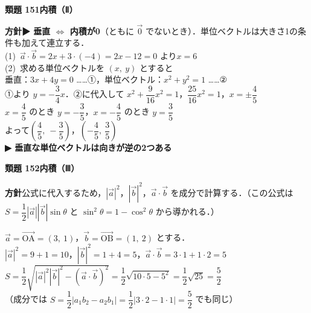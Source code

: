 \documentclass[a4paper,11pt]{ltjsarticle}
\newcommand{\ans}[2]{\Needspace{5\baselineskip}\vspace{6pt}%
  {\sffamily\bfseries 類題 #1\quad #2}\par}
\newcommand{\point}[1]{\textsf{\bfseries ▶ #1}}
\newcommand{\ax}[4]{\draw[->] (#1,0)--(#2,0) node[right]{\scriptsize $x$};
  \draw[->] (0,#3)--(0,#4) node[above]{\scriptsize $y$};
  \node[below left] at (0,0){\scriptsize O};}
\begin{document}
\ans{151}{内積（Ⅱ）}
\begin{kai}
\textbf{方針}\quad \point{垂直 $\iff$ 内積が0}（ともに $\vec0$ でないとき）．単位ベクトルは大きさ1の条件も加えて連立する．\\[2pt]
(1)\ $\vec a\cdot\vec b=2x+3\cdot(-4)=2x-12=0$ より\quad $x=6$\\[2pt]
(2)\ 求める単位ベクトルを $(x,\ y)$ とすると\\
\hspace*{1.5em}垂直：$3x+4y=0$ ……①，\quad 単位ベクトル：$x^2+y^2=1$ ……②\\
\hspace*{1.5em}①より $y=-\dfrac34x$．②に代入して $x^2+\dfrac9{16}x^2=1$，$\dfrac{25}{16}x^2=1$，$x=\pm\dfrac45$\\
\hspace*{1.5em}$x=\dfrac45$ のとき $y=-\dfrac35$，\quad $x=-\dfrac45$ のとき $y=\dfrac35$\\
\hspace*{1.5em}よって\quad $\left(\dfrac45,\ -\dfrac35\right)$，\quad $\left(-\dfrac45,\ \dfrac35\right)$\\
\hspace*{1.5em}\point{垂直な単位ベクトルは向きが逆の2つある}
\begin{center}
\end{center}
\end{kai}

\ans{152}{内積（Ⅲ）}
\begin{kai}
\textbf{方針}\quad 公式に代入するため，$|\vec a|^2$，$|\vec b|^2$，$\vec a\cdot\vec b$ を成分で計算する．（この公式は $S=\dfrac12|\vec a||\vec b|\sin\theta$ と $\sin^2\theta=1-\cos^2\theta$ から導かれる．）\\[2pt]
\begin{center}
\end{center}
$\vec a=\overrightarrow{\mathrm{OA}}=(3,\ 1)$，$\vec b=\overrightarrow{\mathrm{OB}}=(1,\ 2)$ とする．\\
\hspace*{1.5em}$|\vec a|^2=9+1=10$，\quad $|\vec b|^2=1+4=5$，\quad $\vec a\cdot\vec b=3\cdot1+1\cdot2=5$\\[2pt]
$S=\dfrac12\sqrt{|\vec a|^2|\vec b|^2-(\vec a\cdot\vec b)^2}=\dfrac12\sqrt{10\cdot5-5^2}=\dfrac12\sqrt{25}=\dfrac52$\\[2pt]
（成分では $S=\dfrac12|a_1b_2-a_2b_1|=\dfrac12|3\cdot2-1\cdot1|=\dfrac52$ でも同じ）
\end{kai}
\end{document}

